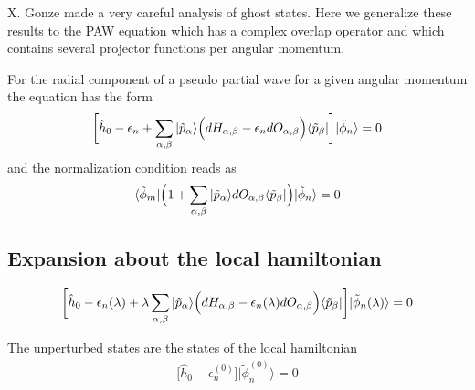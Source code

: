 \documentclass[11pt,a4paper]{report}
\begin{document}
X. Gonze made a very careful analysis of ghost
states\cite{gonze91_prb44_8503}. Here we generalize these results to
the PAW equation which has a complex overlap operator and which
contains several projector functions per angular momentum.

For the radial component of a pseudo partial wave for a given angular
momentum the equation has the form
\begin{eqnarray}
\biggl[\hat{h}_0-\epsilon_n+\sum_{\alpha,\beta}|\tilde{p}_\alpha\rangle
\Bigl(dH_{\alpha,\beta}-\epsilon_n dO_{\alpha,\beta}\Bigr)
\langle\tilde{p}_\beta|\biggr]|\tilde{\phi}_n\rangle=0
\end{eqnarray}
and the normalization condition reads as
\begin{eqnarray}
\langle\tilde{\phi}_m|\Bigl(1+\sum_{\alpha,\beta}|\tilde{p}_\alpha\rangle
dO_{\alpha,\beta}
\langle\tilde{p}_\beta|\Bigr)|\tilde{\phi}_n\rangle=0
\end{eqnarray}

\subsection{Expansion about the local hamiltonian}
\begin{eqnarray}
\biggl[\hat{h}_0-\epsilon_n(\lambda)+\lambda 
\sum_{\alpha,\beta}|\tilde{p}_\alpha\rangle
\Bigl(dH_{\alpha,\beta}-\epsilon_n(\lambda) dO_{\alpha,\beta}\Bigr)
\langle\tilde{p}_\beta|\biggr]|\tilde{\phi}_n(\lambda)\rangle=0
\end{eqnarray}

The unperturbed states are the states of the local hamiltonian
\begin{eqnarray}
\biggl[\hat{h}_0-\epsilon_n^{(0)}\biggr]|\tilde{\phi}_n^{(0)}\rangle=0
\end{eqnarray}
\end{document}
